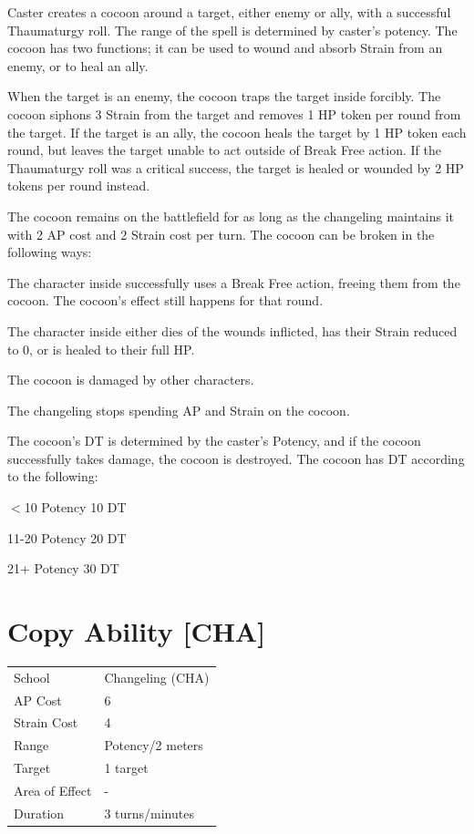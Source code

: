 \documentclass[11pt,a4paper,twocolumn]{book}
\begin{document}
	\medskip
	
	Caster creates a cocoon around a target, either enemy or ally, with a successful Thaumaturgy roll. The range of the spell is determined by caster's potency. The cocoon has two functions; it can be used to wound and absorb Strain from an enemy, or to heal an ally.
	
	When the target is an enemy, the cocoon traps the target inside forcibly. The cocoon siphons 3 Strain from the target and removes 1 HP token per round from the target. If the target is an ally, the cocoon heals the target by 1 HP token each round, but leaves the target unable to act outside of Break Free action. If the Thaumaturgy roll was a critical success, the target is healed or wounded by 2 HP tokens per round instead.
	
	The cocoon remains on the battlefield for as long as the changeling maintains it with 2 AP cost and 2 Strain cost per turn. The cocoon can be broken in the following ways:
	
	\begin{compactitem}
		\item The character inside successfully uses a Break Free action, freeing them from the cocoon. The cocoon's effect still happens for that round.
		\item The character inside either dies of the wounds inflicted, has their Strain reduced to 0, or is healed to their full HP.
		\item The cocoon is damaged by other characters.
		\item The changeling stops spending AP and Strain on the cocoon.
	\end{compactitem}
	
	

	
	The cocoon's DT is determined by the caster's Potency, and if the cocoon successfully takes damage, the cocoon is destroyed. The cocoon has DT according to the following:
	\begin{compactitem}
		\item $<$10 Potency 	10 DT
		\item 11-20 Potency 	20 DT
		\item 21+ Potency 		30 DT
	\end{compactitem}
	
		\section*{Copy Ability [CHA]}
	{
		\begin{tabu} to 75mm{| X[l,4] | X[l,7] |}
			\hline
			School 			&  	Changeling (CHA)\\
			AP Cost	      	&  6				\\
			Strain Cost     &  4				\\
			Range     		&  Potency/2 meters	\\
			Target      	&  1 target			\\
			Area of Effect  &  -	 			\\
			Duration     	&  3 turns/minutes	\\ \hline
		\end{tabu}
		
	}
	
\end{document}
